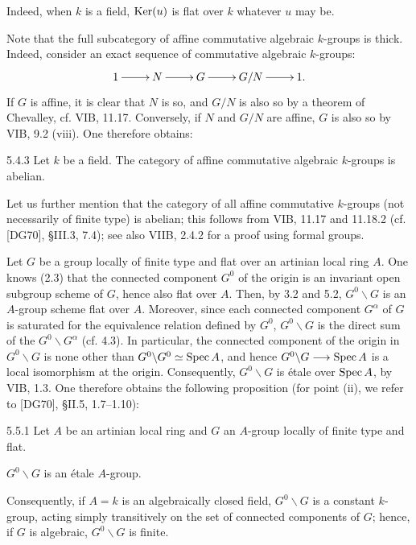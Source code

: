 Indeed, when $k$ is a field, $\operatorname{Ker}(u)$ is flat over $k$ whatever $u$ may be.

Note that the full subcategory of affine commutative algebraic $k$-groups is thick. Indeed, consider an exact sequence of commutative algebraic $k$-groups:
\[
\xymatrix{1\ar[r]&N\ar[r]&G\ar[r]&G/N\ar[r]&1.}
\]
If $G$ is affine, it is clear that $N$ is so, and $G/N$ is also so by a theorem of Chevalley, cf. VIB, 11.17. Conversely, if $N$ and $G/N$ are affine, $G$ is also so by VIB, 9.2 (viii). One therefore obtains:
\begin{corollary}{5.4.3}\label{VIA.5.4.3}
Let $k$ be a field. The category of affine commutative algebraic $k$-groups is abelian.
\end{corollary}
Let us further mention that the category of all affine commutative $k$-groups (not necessarily of finite type) is abelian; this follows from VIB, 11.17 and 11.18.2 (cf. [DG70], §III.3, 7.4); see also VIIB, 2.4.2 for a proof using formal groups.

Let $G$ be a group locally of finite type and flat over an artinian local ring $A$. One knows (2.3) that the connected component $G^0$ of the origin is an invariant open subgroup scheme of $G$, hence also flat over $A$. Then, by 3.2 and 5.2, $G^0\backslash G$ is an $A$-group scheme flat over $A$. Moreover, since each connected component $G^\alpha$ of $G$ is saturated for the equivalence relation defined by $G^0$, $G^0\backslash G$ is the direct sum of the $G^0\backslash G^\alpha$ (cf. 4.3). In particular, the connected component of the origin in $G^0\backslash G$ is none other than $G^0\backslash G^0\simeq\operatorname{Spec} A$, and hence $G^0\backslash G\longrightarrow\operatorname{Spec} A$ is a local isomorphism at the origin. Consequently, $G^0\backslash G$ is étale over $\operatorname{Spec} A$, by VIB, 1.3. One therefore obtains the following proposition (for point (ii), we refer to [DG70], §II.5, 1.7--1.10):
\begin{proposition}{5.5.1}\label{VIA.5.5.1}
Let $A$ be an artinian local ring and $G$ an $A$-group locally of finite type and flat.
\begin{enumeratei}
\item $G^0\backslash G$ is an étale $A$-group.
\item Consequently, if $A=k$ is an algebraically closed field, $G^0\backslash G$ is a constant $k$-group, acting simply transitively on the set of connected components of $G$; hence, if $G$ is algebraic, $G^0\backslash G$ is finite.
\end{enumeratei}
\end{proposition}

